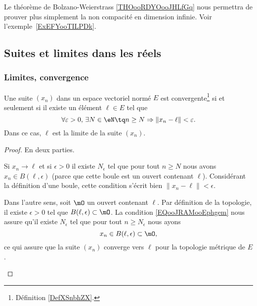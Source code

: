Le théorème de Bolzano-Weierstrass \ref{THOooRDYOooJHLfGq} nous permettra de prouver plus simplement la non compacité en dimension infinie. Voir l'exemple~\ref{ExEFYooTILPDk}.

\subsection{Suites et limites dans les réels}

\subsubsection{Limites, convergence}

\begin{proposition}     \label{PROPooOSXCooJWXkWH}
	Une suite \( (x_n)\) dans un espace vectoriel normé \( E\) est convergente\footnote{Définition \ref{DefXSnbhZX}.} si et seulement si il existe un élément \( \ell\in E\) tel que
	\begin{equation}		\label{EQooJRAMooEphgem}
		\forall \varepsilon>0,\,\exists N\in\eN\tq n\geq N\Rightarrow \| x_n-\ell \|<\varepsilon.
	\end{equation}
	Dans ce cas, \( \ell\) est la limite de la suite \( (x_n)\).
\end{proposition}

\begin{proof}
	En deux parties.
	\begin{subproof}
		Si \( x_n\to \ell\) et si \( \epsilon>0\) il existe \( N_{\epsilon}\) tel que pour tout \( n\geq N\) nous avons \( x_n\in B(\ell,\epsilon)\) (parce que cette boule est un ouvert contenant \( \ell\)). Considérant la définition d'une boule, cette condition s'écrit bien \( \| x_n-\ell \|<\epsilon\).

		Dans l'autre sens, soit \( \mO\) un ouvert contenant \( \ell\). Par définition de la topologie, il existe \( \epsilon>0\) tel que \( B(\ell,\epsilon)\subset \mO\). La condition \eqref{EQooJRAMooEphgem} nous assure qu'il existe \( N_{\epsilon} \) tel que pour tout \( n\geq N_{\epsilon}\) nous ayons
		\begin{equation}
			x_n\in B(\ell,\epsilon)\subset\mO,
		\end{equation}
		ce qui assure que la suite \( (x_n)\) converge vers \( \ell\) pour la topologie métrique de \( E\).
	\end{subproof}
\end{proof}


